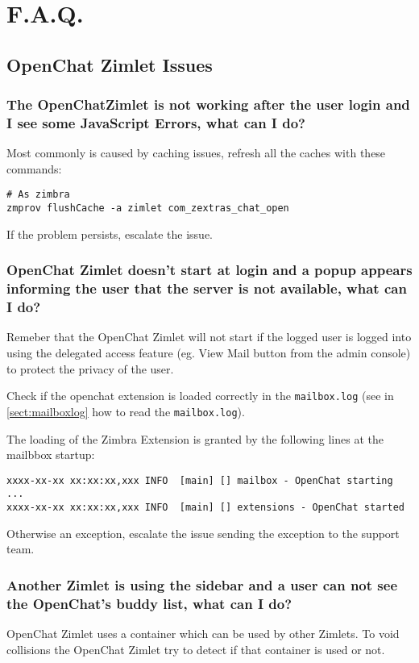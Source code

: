 \section{F.A.Q.}

    \subsection[Zimlet Issues]{OpenChat Zimlet Issues}

    \subsubsection{The OpenChatZimlet is not working after the user login and I see some JavaScript Errors, what can I do?}
        Most commonly is caused by caching issues, refresh all the caches with these commands:
        \begin{verbatim}
# As zimbra
zmprov flushCache -a zimlet com_zextras_chat_open
        \end{verbatim}
        If the problem persists, escalate the issue.

    \subsubsection{OpenChat Zimlet doesn’t start at login and a popup appears informing the user that the server is not
    available, what can I do?}
        \begin{info}
            Remeber that the OpenChat Zimlet will not start if the logged user is logged into using the delegated access
            feature (eg. View Mail button from the admin console) to protect the privacy of the user.
        \end{info}

        Check if the openchat extension is loaded correctly in the \verb+mailbox.log+ (see in \autoref{sect:mailboxlog}
        how to read the \verb+mailbox.log+).

        The loading of the Zimbra Extension is granted by the following lines at the mailbbox startup:
        \begin{verbatim}
xxxx-xx-xx xx:xx:xx,xxx INFO  [main] [] mailbox - OpenChat starting ...
xxxx-xx-xx xx:xx:xx,xxx INFO  [main] [] extensions - OpenChat started
        \end{verbatim}
        Otherwise an exception, escalate the issue sending the exception to the support team.

    \subsubsection{Another Zimlet is using the sidebar and a user can not see the OpenChat's buddy list, what can I do?}
        OpenChat Zimlet uses a container which can be used by other Zimlets. To void collisions the OpenChat Zimlet try
        to detect if that container is used or not.


